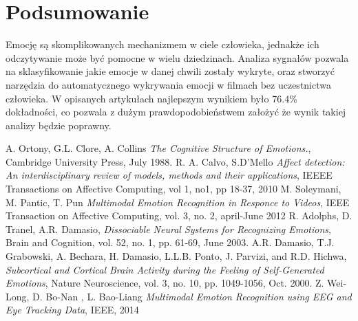 \documentclass[10pt,journal,compsoc,twoside]{IEEEtran}
\begin{document}
\section{Podsumowanie}

Emocję są skomplikowanych mechanizmem w ciele człowieka, jednakże ich odczytywanie może być pomocne w wielu dziedzinach. Analiza sygnałów pozwala na sklasyfikowanie jakie emocje w danej chwili zostały wykryte, oraz stworzyć narzędzia do automatycznego wykrywania emocji w filmach bez uczestnictwa człowieka. W opisanych artykułach najlepszym wynikiem było 76.4\% dokładności, co pozwala z dużym prawdopodobieństwem założyć że wynik takiej analizy będzie poprawny.

\begin{thebibliography}{99}
A. Ortony, G.L. Clore, A. Collins \textit{The Cognitive Structure of Emotions.}, Cambridge University Press, July 1988.
 R. A. Calvo, S.D'Mello \textit{Affect detection: An interdisciplinary review of models, methods and their applications}, IEEEE Transactions on Affective Computing, vol 1, no1, pp 18-37, 2010
 M. Soleymani, M. Pantic, T. Pun \textit{Multimodal Emotion Recognition in Responce to Videos}, IEEE Transaction on Affective Computing, vol. 3, no. 2, april-June 2012
R. Adolphs, D. Tranel, A.R. Damasio, \textit{Dissociable Neural Systems for Recognizing Emotions}, Brain and Cognition, vol. 52, no. 1, pp. 61-69, June 2003.
 A.R. Damasio, T.J. Grabowski, A. Bechara, H. Damasio, L.L.B.
Ponto, J. Parvizi, and R.D. Hichwa, \textit{Subcortical and Cortical Brain
Activity during the Feeling of Self-Generated Emotions}, Nature
Neuroscience, vol. 3, no. 10, pp. 1049-1056, Oct. 2000.
 Z. Wei-Long, D. Bo-Nan , L. Bao-Liang 
\textit{Multimodal Emotion Recognition using EEG and Eye Tracking Data}, IEEE, 2014


\end{thebibliography}
\end{document}
